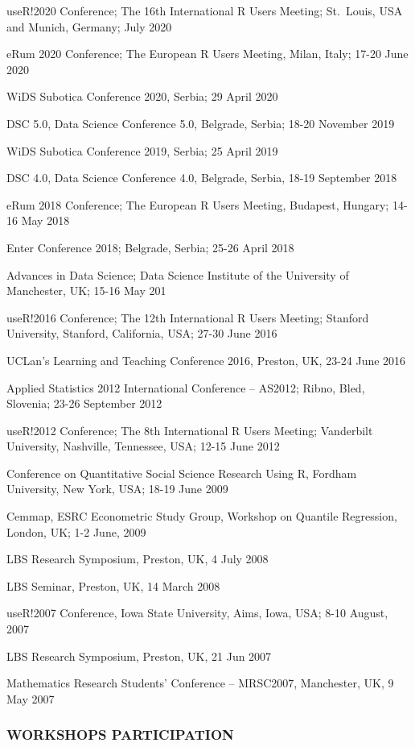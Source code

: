 \documentclass[
]{article}
\begin{document}
useR!2020 Conference; The 16th International R Users Meeting; St.~Louis,
USA and Munich, Germany; July 2020

eRum 2020 Conference; The European R Users Meeting, Milan, Italy; 17-20
June 2020

WiDS Subotica Conference 2020, Serbia; 29 April 2020

DSC 5.0, Data Science Conference 5.0, Belgrade, Serbia; 18-20 November
2019

WiDS Subotica Conference 2019, Serbia; 25 April 2019

DSC 4.0, Data Science Conference 4.0, Belgrade, Serbia, 18-19 September
2018

eRum 2018 Conference; The European R Users Meeting, Budapest, Hungary;
14-16 May 2018

Enter Conference 2018; Belgrade, Serbia; 25-26 April 2018

Advances in Data Science; Data Science Institute of the University of
Manchester, UK; 15-16 May 201

useR!2016 Conference; The 12th International R Users Meeting; Stanford
University, Stanford, California, USA; 27-30 June 2016

UCLan's Learning and Teaching Conference 2016, Preston, UK, 23-24 June
2016

Applied Statistics 2012 International Conference -- AS2012; Ribno, Bled,
Slovenia; 23-26 September 2012

useR!2012 Conference; The 8th International R Users Meeting; Vanderbilt
University, Nashville, Tennessee, USA; 12-15 June 2012

Conference on Quantitative Social Science Research Using R, Fordham
University, New York, USA; 18-19 June 2009

Cemmap, ESRC Econometric Study Group, Workshop on Quantile Regression,
London, UK; 1-2 June, 2009

LBS Research Symposium, Preston, UK, 4 July 2008

LBS Seminar, Preston, UK, 14 March 2008

useR!2007 Conference, Iowa State University, Aims, Iowa, USA; 8-10
August, 2007

LBS Research Symposium, Preston, UK, 21 Jun 2007

Mathematics Research Students' Conference -- MRSC2007, Manchester, UK, 9
May 2007

\hypertarget{workshops-participation}{%
\subsubsection{WORKSHOPS PARTICIPATION}\label{workshops-participation}}
\end{document}
